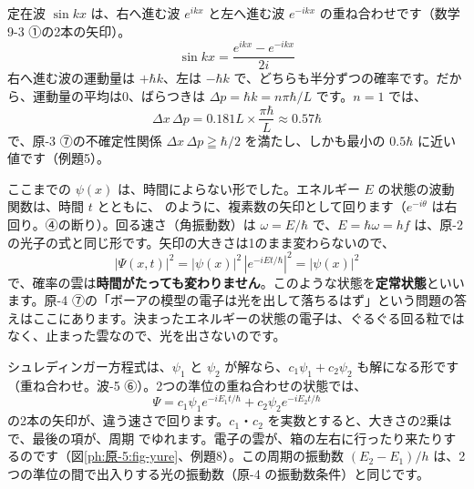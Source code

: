 定在波 $\sin kx$ は、右へ進む波 $e^{ikx}$ と左へ進む波 $e^{-ikx}$ の重ね合わせです（数学 9-3 ①の2本の矢印）。
\[\sin kx=\frac{e^{ikx}-e^{-ikx}}{2i}\]
右へ進む波の運動量は $+\hbar k$、左は $-\hbar k$ で、どちらも半分ずつの確率です。だから、運動量の平均は0、ばらつきは $\Delta p=\hbar k=n\pi\hbar/L$ です。$n=1$ では、
\[\Delta x\,\Delta p=0.181L\times\frac{\pi\hbar}{L}\approx0.57\hbar\]
で、原-3 ⑦の不確定性関係 $\Delta x\,\Delta p\geqq\hbar/2$ を満たし、しかも最小の $0.5\hbar$ に近い値です（例題5）。

\label{ph:原-5:sec10}
ここまでの $\psi(x)$ は、時間によらない形でした。エネルギー $E$ の状態の波動関数は、時間 $t$ とともに、
のように、複素数の矢印として回ります（$e^{-i\theta}$ は右回り。④の断り）。回る速さ（角振動数）は $\omega=E/\hbar$ で、$E=\hbar\omega=hf$ は、原-2 の光子の式と同じ形です。矢印の大きさは1のまま変わらないので、
\[|\Psi(x,t)|^2=|\psi(x)|^2\,|e^{-iEt/\hbar}|^2=|\psi(x)|^2\]
で、確率の雲は\textbf{時間がたっても変わりません}。このような状態を\textbf{定常状態}といいます。原-4 ⑦の「ボーアの模型の電子は光を出して落ちるはず」という問題の答えはここにあります。決まったエネルギーの状態の電子は、ぐるぐる回る粒ではなく、止まった雲なので、光を出さないのです。

シュレディンガー方程式は、$\psi_1$ と $\psi_2$ が解なら、$c_1\psi_1+c_2\psi_2$ も解になる形です（重ね合わせ。波-5 ⑥）。2つの準位の重ね合わせの状態では、
\[\Psi=c_1\psi_1e^{-iE_1t/\hbar}+c_2\psi_2e^{-iE_2t/\hbar}\]
の2本の矢印が、違う速さで回ります。$c_1$・$c_2$ を実数とすると、大きさの2乗は
で、最後の項が、周期
でゆれます。電子の雲が、箱の左右に行ったり来たりするのです（図\ref{ph:原-5:fig-yure}、例題8）。この周期の振動数 $(E_2-E_1)/h$ は、2つの準位の間で出入りする光の振動数（原-4 の振動数条件）と同じです。

